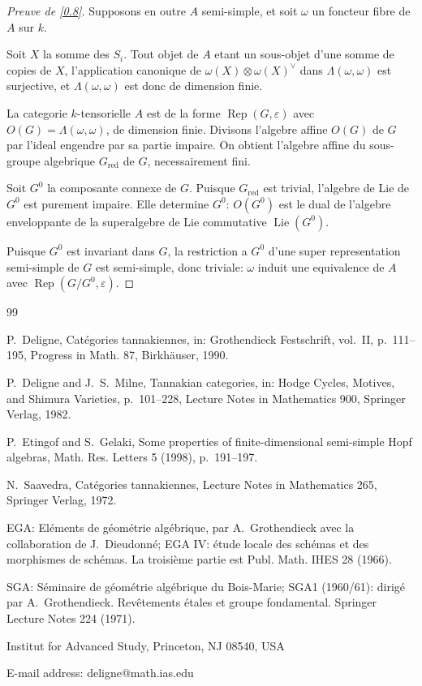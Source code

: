 \documentclass[11pt,a4paper]{article}
\theoremstyle{plain}
\theoremstyle{definition}
\newcommand{\Rep}{\operatorname{Rep}}
\begin{document}
\begin{proof}[Preuve de \ref{0.8}]
Supposons en outre $A$ semi-simple, et soit $\omega$ un foncteur fibre de $A$ sur $k$.

Soit $X$ la somme des $S_i$. Tout objet de $A$ etant un sous-objet d'une somme de copies de $X$, l'application canonique de $\omega(X)\otimes\omega(X)^\vee$ dans $\Lambda(\omega,\omega)$ est surjective, et $\Lambda(\omega,\omega)$ est donc de dimension finie.

La categorie $k$-tensorielle $A$ est de la forme $\Rep(G,\varepsilon)$ avec $O(G)=\Lambda(\omega,\omega)$, de dimension finie. Divisons l'algebre affine $O(G)$ de $G$ par l'ideal engendre par sa partie impaire. On obtient l'algebre affine du sous-groupe algebrique $G_{\text{red}}$ de $G$, necessairement fini.

Soit $G^0$ la composante connexe de $G$. Puisque $G_{\text{red}}$ est trivial, l'algebre de Lie de $G^0$ est purement impaire. Elle determine $G^0$: $O(G^0)$ est le dual de l'algebre enveloppante de la superalgebre de Lie commutative $\operatorname{Lie}(G^0)$.

Puisque $G^0$ est invariant dans $G$, la restriction a $G^0$ d'une super representation semi-simple de $G$ est semi-simple, donc triviale: $\omega$ induit une equivalence de $A$ avec $\Rep(G/G^0,\varepsilon)$.
\end{proof}


\begin{thebibliography}{99}

P.~Deligne, Cat\'egories tannakiennes, in: Grothendieck Festschrift, vol.~II, p.~111--195, Progress in Math. 87, Birkh\"auser, 1990.

P.~Deligne and J.~S.~Milne, Tannakian categories, in: Hodge Cycles, Motives, and Shimura Varieties, p.~101--228, Lecture Notes in Mathematics 900, Springer Verlag, 1982.

P.~Etingof and S.~Gelaki, Some properties of finite-dimensional semi-simple Hopf algebras, Math. Res. Letters 5 (1998), p.~191--197.

N.~Saavedra, Cat\'egories tannakiennes, Lecture Notes in Mathematics 265, Springer Verlag, 1972.

EGA: El\'ements de g\'eom\'etrie alg\'ebrique, par A.~Grothendieck avec la collaboration de J.~Dieudonn\'e; EGA IV: \'etude locale des sch\'emas et des morphismes de sch\'emas. La troisi\`eme partie est Publ. Math. IHES 28 (1966).

SGA: S\'eminaire de g\'eom\'etrie alg\'ebrique du Bois-Marie; SGA1 (1960/61): dirig\'e par A.~Grothendieck. Rev\^etements \'etales et groupe fondamental. Springer Lecture Notes 224 (1971).

\end{thebibliography}

\medskip
\noindent Institut for Advanced Study, Princeton, NJ 08540, USA

\noindent E-mail address: deligne@math.ias.edu
\end{document}
